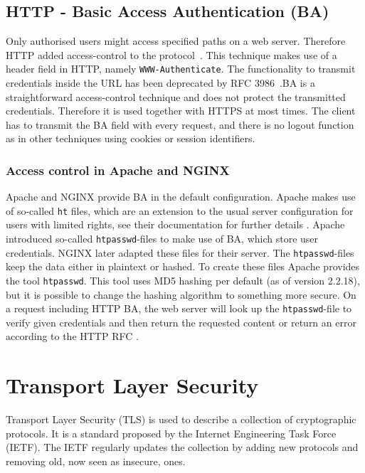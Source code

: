 \subsection{HTTP - Basic Access Authentication (BA)}

Only authorised users might access specified paths on a web server. Therefore
HTTP added access-control to the protocol~. This
technique makes use of a header field in HTTP, namely \texttt{WWW-Authenticate}.
The functionality to transmit credentials inside the URL has been deprecated by
RFC 3986~.BA is a straightforward access-control
technique and does not protect the transmitted credentials. Therefore it is used
together with HTTPS at most times. The client has to transmit the BA field with
every request, and there is no logout function as in other techniques using
cookies or session identifiers.

\subsubsection{Access control in Apache and NGINX}

Apache and NGINX provide BA in the default configuration. Apache makes use of
so-called \texttt{ht} files, which are an extension to the usual server
configuration for users with limited rights, see their documentation for further
details . Apache introduced so-called
\texttt{htpasswd}-files to make use of BA, which store user credentials. NGINX
later adapted these files for their server. The \texttt{htpasswd}-files keep the
data either in plaintext or hashed. To create these files Apache provides the
tool \texttt{htpasswd}. This tool uses MD5
hashing per default (as of version 2.2.18), but it is possible to change the
hashing algorithm to something more secure. On a request including HTTP BA, the
web server will look up the \texttt{htpasswd}-file to verify given credentials
and then return the requested content or return an error according to the HTTP
RFC .

\section{Transport Layer Security}

Transport Layer Security (TLS) is used to describe a collection of cryptographic
protocols. It is a standard proposed by the Internet Engineering Task Force
(IETF). The IETF regularly updates the collection by adding new protocols and
removing old, now seen as insecure, ones.


